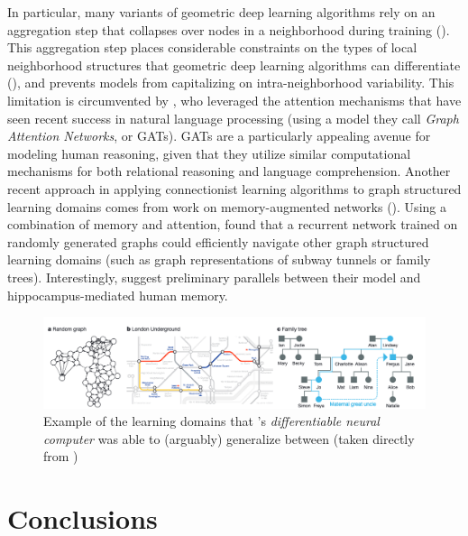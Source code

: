 \documentclass[12pt]{article}
\let\oldcite=\cite
\let\oldtextcite=\textcite
\renewcommand{\cite}[1]{\textcolor[rgb]{0, .121, .388}{\oldcite{#1}}}
\renewcommand{\textcite}[1]{\textcolor[rgb]{0, .121, .388}{\oldtextcite{#1}}}
\begin{document}
In particular, many variants of geometric deep learning algorithms rely on an aggregation step that collapses over nodes in a neighborhood during training (\cite{wu2020comprehensive}). This aggregation step places considerable constraints on the types of local neighborhood structures that geometric deep learning algorithms can differentiate (\cite{xu2018powerful}), and prevents models from capitalizing on intra-neighborhood variability. This limitation is circumvented by \textcite{velivckovic2017graph}, who leveraged the attention mechanisms that have seen recent success in natural language processing (using a model they call \emph{Graph Attention Networks}, or GATs). GATs are a particularly appealing avenue for modeling human reasoning, given that they utilize similar computational mechanisms for both relational reasoning and language comprehension. Another recent approach in applying connectionist learning algorithms to graph structured learning domains comes from work on memory-augmented networks (\cite{graves2016hybrid}). Using a combination of memory and attention, \textcite{graves2016hybrid} found that a recurrent network trained on randomly generated graphs could efficiently navigate other graph structured learning domains (such as graph representations of subway tunnels or family trees). Interestingly, \textcite{graves2016hybrid} suggest preliminary parallels between their model and hippocampus-mediated human memory.

\begin{figure}[h]
    \centering
    \label{fig:DNC}
    \includegraphics[scale=.4]{figures/DNC.png}
    \caption{Example of the learning domains that \textcite{graves2016hybrid}'s \emph{differentiable neural computer} was able to (arguably) generalize between (taken directly from \cite{graves2016hybrid})}
\end{figure}


\section{Conclusions}
\end{document}

